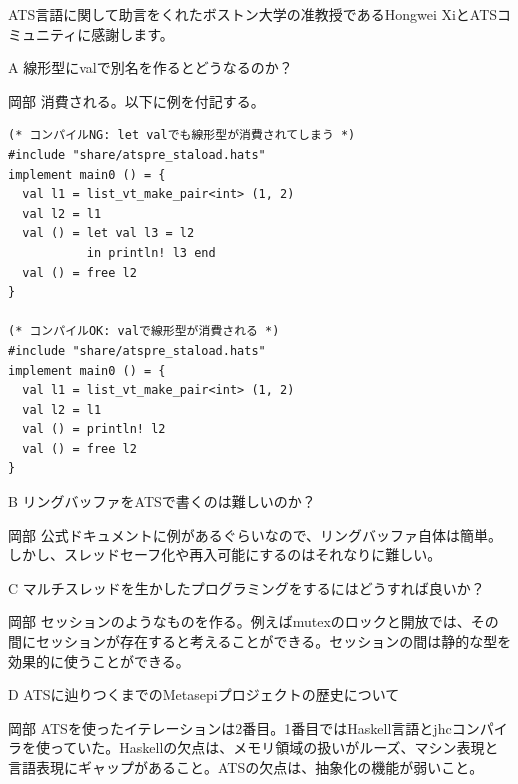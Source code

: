 \documentclass{ipsjprosym}
\begin{document}
\begin{acknowledgment}
ATS言語に関して助言をくれたボストン大学の准教授であるHongwei XiとATSコミュニティに感謝します。
\end{acknowledgment}

\begin{QandA}
\item[A] 線形型にvalで別名を作るとどうなるのか？
\item[岡部] 消費される。以下に例を付記する。

\begin{verbatim}
(* コンパイルNG: let valでも線形型が消費されてしまう *)
#include "share/atspre_staload.hats"
implement main0 () = {
  val l1 = list_vt_make_pair<int> (1, 2)
  val l2 = l1
  val () = let val l3 = l2
           in println! l3 end
  val () = free l2
}

(* コンパイルOK: valで線形型が消費される *)
#include "share/atspre_staload.hats"
implement main0 () = {
  val l1 = list_vt_make_pair<int> (1, 2)
  val l2 = l1
  val () = println! l2
  val () = free l2
}
\end{verbatim}

\item[B] リングバッファをATSで書くのは難しいのか？
\item[岡部] 公式ドキュメントに例があるぐらいなので、リングバッファ自体は簡単。しかし、スレッドセーフ化や再入可能にするのはそれなりに難しい。
\item[C] マルチスレッドを生かしたプログラミングをするにはどうすれば良いか？
\item[岡部] セッションのようなものを作る。例えばmutexのロックと開放では、その間にセッションが存在すると考えることができる。セッションの間は静的な型を効果的に使うことができる。
\item[D] ATSに辿りつくまでのMetasepiプロジェクトの歴史について
\item[岡部] ATSを使ったイテレーションは2番目。1番目ではHaskell言語とjhcコンパイラを使っていた。Haskellの欠点は、メモリ領域の扱いがルーズ、マシン表現と言語表現にギャップがあること。ATSの欠点は、抽象化の機能が弱いこと。
\end{QandA}



\end{document}
